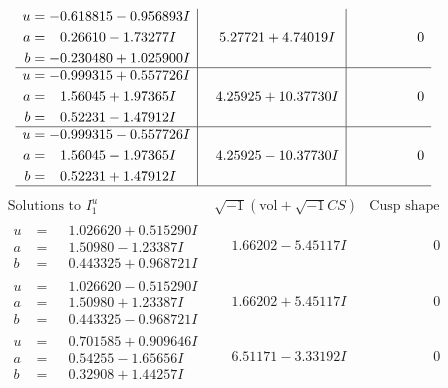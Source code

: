 \documentclass[1p]{elsarticle_modified}
\theoremstyle{definition}
\newcommand{\I}{\sqrt{-1}}
\begin{document}
$$\begin{array}{c|c|c}
\begin{aligned}
u &= -0.618815 - 0.956893 I \\
a &= \phantom{-}0.26610 - 1.73277 I \\
b &= -0.230480 + 1.025900 I\end{aligned}
 & \phantom{-}5.27721 + 4.74019 I & \phantom{-0.000000 } 0 \\ \hline\begin{aligned}
u &= -0.999315 + 0.557726 I \\
a &= \phantom{-}1.56045 + 1.97365 I \\
b &= \phantom{-}0.52231 - 1.47912 I\end{aligned}
 & \phantom{-}4.25925 + 10.37730 I & \phantom{-0.000000 } 0 \\ \hline\begin{aligned}
u &= -0.999315 - 0.557726 I \\
a &= \phantom{-}1.56045 - 1.97365 I \\
b &= \phantom{-}0.52231 + 1.47912 I\end{aligned}
 & \phantom{-}4.25925 - 10.37730 I & \phantom{-0.000000 } 0\\
 \hline 
 \end{array}$$\newpage$$\begin{array}{c|c|c}  
\text{Solutions to }I^u_{1}& \I (\text{vol} + \sqrt{-1}CS) & \text{Cusp shape}\\
 \hline 
\begin{aligned}
u &= \phantom{-}1.026620 + 0.515290 I \\
a &= \phantom{-}1.50980 - 1.23387 I \\
b &= \phantom{-}0.443325 + 0.968721 I\end{aligned}
 & \phantom{-}1.66202 - 5.45117 I & \phantom{-0.000000 } 0 \\ \hline\begin{aligned}
u &= \phantom{-}1.026620 - 0.515290 I \\
a &= \phantom{-}1.50980 + 1.23387 I \\
b &= \phantom{-}0.443325 - 0.968721 I\end{aligned}
 & \phantom{-}1.66202 + 5.45117 I & \phantom{-0.000000 } 0 \\ \hline\begin{aligned}
u &= \phantom{-}0.701585 + 0.909646 I \\
a &= \phantom{-}0.54255 - 1.65656 I \\
b &= \phantom{-}0.32908 + 1.44257 I\end{aligned}
 & \phantom{-}6.51171 - 3.33192 I & \phantom{-0.000000 } 0 \\ \hline\begin{aligned}

\end{aligned}
\end{array}$$
\end{document}
